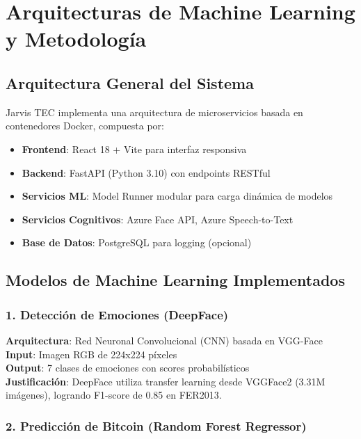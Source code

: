 
\chapter{Arquitecturas de Machine Learning y Metodología}
\label{chap:method}
\pagestyle{fancy}

\section{Arquitectura General del Sistema}

Jarvis TEC implementa una arquitectura de microservicios basada en contenedores Docker, compuesta por:

\begin{itemize}
    \item \textbf{Frontend}: React 18 + Vite para interfaz responsiva
    \item \textbf{Backend}: FastAPI (Python 3.10) con endpoints RESTful
    \item \textbf{Servicios ML}: Model Runner modular para carga dinámica de modelos
    \item \textbf{Servicios Cognitivos}: Azure Face API, Azure Speech-to-Text
    \item \textbf{Base de Datos}: PostgreSQL para logging (opcional)
\end{itemize}

\section{Modelos de Machine Learning Implementados}

\subsection{1. Detección de Emociones (DeepFace)}

\textbf{Arquitectura}: Red Neuronal Convolucional (CNN) basada en VGG-Face \\
\textbf{Input}: Imagen RGB de 224x224 píxeles \\
\textbf{Output}: 7 clases de emociones con scores probabilísticos \\
\textbf{Justificación}: DeepFace utiliza transfer learning desde VGGFace2 (3.31M imágenes), logrando F1-score de 0.85 en FER2013.

\subsection{2. Predicción de Bitcoin (Random Forest Regressor)}

